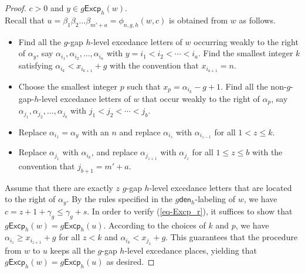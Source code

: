 \documentclass[10pt,a4paper]{amsart}
\def\Excp{\mathsf{Excp}}
\def\den{\mathsf{den}}
\begin{document}
\begin{proof}
   
  $c>0$ and $y\in g\Excp_h(w)$.\\
Recall that   $u=\beta_1\beta_2\ldots\beta_{m'+a}=\phi_{n,g,h}(w,c)$ is obtained  from $w$ as follows.
	\begin{itemize}
	\item  Find all the $g$-gap $h$-level excedance letters   of $w$  occurring      weakly to the right of   $\alpha_y$,  say
	$\alpha_{i_1}, \alpha_{i_2}, \ldots, \alpha_{i_a}$ with
	$ y=i_1<i_2<\cdots <i_a$. Find the smallest  integer $k$ satisfying $\alpha_{i_k}< x_{i_{k+1}}+g$   with the convention that $x_{i_{a+1}}=n$.
	\item    
	Choose the smallest integer  $p$ such that $x_p=\alpha_{i_k}-g+1$.	Find all the  non-$g$-gap-$h$-level excedance letters of $w$ that occur   weakly   to  the right  of $\alpha_{p}$, say $\alpha_{j_1}, \alpha_{j_2}, \ldots, \alpha_{j_b}$ with $ j_1<j_2<\cdots<j_b$.    
	\item   Replace  $\alpha_{i_1}=\alpha_y$ with an  $n$ and replace   $\alpha_{i_{z}}$  with $\alpha_{i_{z-1}}$  for all $1< z\leq k$. 
	
	\item  Replace  $\alpha_{j_1}$ with $\alpha_{i_k}$,  and  replace  $\alpha_{j_{z+1}}$ with $\alpha_{j_{z}}$ for all $1\leq z\leq b $  with the convention that $j_{b+1}=m'+a$.   
\end{itemize}

 Assume that there are exactly  $z$ $g$-gap  $h$-level excedance letters that are located to the right of $\alpha_y$. 
By the rules specified in the $g\den_h$-labeling of $w$, we have $c=z+1+\gamma_g\leq \gamma_g+s$.  In order to verify (\ref{eq-Excp_r}), it suffices to show that  $g\Excp_h(w)=g\Excp_h(u)$. 
According to the choices   of $k$ and $p$, we have $\alpha_{i_z}\geq  x_{i_{z+1}}+g$ for all $z<k$ and $\alpha_{i_k}< x_{j_1}+g$. This guarantees  that   the procedure from $w$ to $u$ keeps  all  the $g$-gap $h$-level excedance places, yielding that $g\Excp_h(w)=g\Excp_h(u)$ as desired.    
 


\end{proof}
\end{document}
